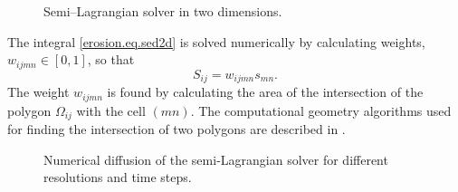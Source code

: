 \begin{figure}[htbp]
  \centering
  
  \caption{Semi--Lagrangian solver in two dimensions.}
  \label{erosion.fig.lag2d}
\end{figure}

The integral \eqref{erosion.eq.sed2d} is solved numerically by calculating weights, $w_{ijmn}\in[0,1]$, so that
\begin{equation}
  S_{ij}=w_{ijmn}s_{mn}.
\end{equation}
The weight $w_{ijmn}$ is found by calculating the area of the intersection of the polygon $\Omega_{ij}$ with the cell $(mn)$. The computational geometry algorithms used for finding the intersection of two polygons are described in \citet{num.12}. 

\begin{figure}[htbp]
  \centering
  \caption{Numerical diffusion of the semi-Lagrangian solver for different resolutions and time steps.}
  \label{erosion.fig.art_diffu}
\end{figure}
